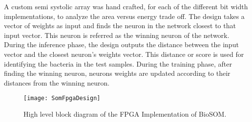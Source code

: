 A custom semi systolic array was hand crafted, for each of the different bit width implementations, to analyze the area versus energy trade off. The design takes a vector of weights as input and finds the neuron in the network closest to that input vector. This neuron is referred as the winning neuron of the network. During the inference phase, the design outputs the distance between the input vector and the closest neuron's weights vector. This distance or score is used for identifying the bacteria in the test samples. During the training phase, after finding the winning neuron, neurons weights are updated according to their distances from the winning neuron.
\begin{figure}[h]
	\centering
	\captionsetup{font=sf}
	\texttt{[image: SomFpgaDesign]}
	\caption{High level block diagram of the FPGA Implementation of BioSOM.}
	\label{fig:SOMFPGAImplementation}
\end{figure}

